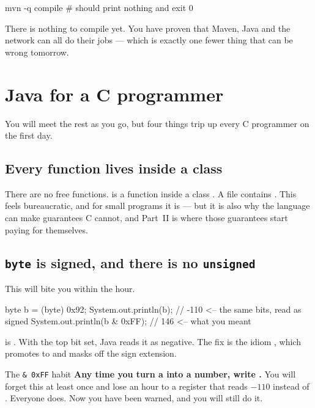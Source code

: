 \begin{shell}
mvn -q compile     # should print nothing and exit 0
\end{shell}

There is nothing to compile yet. You have proven that Maven, Java and the
network can all do their jobs --- which is exactly one fewer thing that can be
wrong tomorrow.

\section{Java for a C programmer}

You will meet the rest as you go, but four things trip up every C programmer on
the first day.

\subsection{Every function lives inside a class}

There are no free functions.  is a function  inside a
class . A file  contains . This feels
bureaucratic, and for small programs it is --- but it is also why the language
can make guarantees C cannot, and Part~II is where those guarantees start paying
for themselves.

\subsection{\texttt{byte} is signed, and there is no \texttt{unsigned}}

This will bite you within the hour.

\begin{jcode}
byte b = (byte) 0x92;
System.out.println(b);          // -110   <-- the same bits, read as signed
System.out.println(b & 0xFF);   // 146    <-- what you meant
\end{jcode}

 is . With the top bit set, Java reads it as negative.
The fix is the idiom , which promotes to  and masks off
the sign extension.

\begin{trap}{The \texttt{\& 0xFF} habit}
\textbf{Any time you turn a  into a number, write .}
You will forget this at least once and lose an hour to a register that reads
$-110$ instead of . Everyone does. Now you have been warned, and you
will still do it.
\end{trap}

